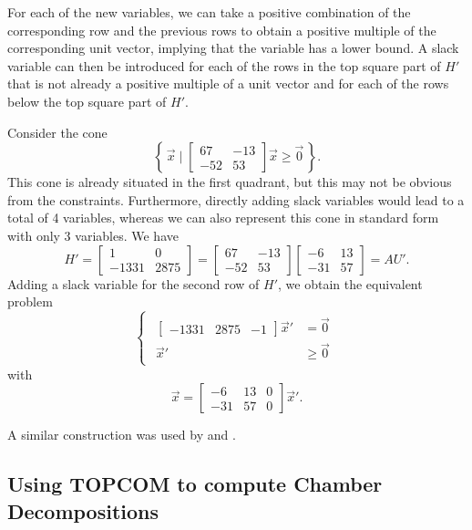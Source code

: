 For each of the new variables, we can take a positive
combination of the corresponding row and the previous rows
to obtain a positive multiple of the corresponding unit vector,
implying that the variable has a lower bound.
A slack variable can then be introduced for each of the
rows in the top square part of $H'$ that is not already
a positive multiple of a unit vector and for each of
the rows below the top square part of $H'$.

\begin{example}
Consider the cone
$$
\left\{\,
\vec x \mid
\begin{bmatrix}
67 & -13 \\
-52 & 53
\end{bmatrix}
\vec x
\ge
\vec 0
\,\right\}
.
$$
This cone is already situated in the first quadrant,
but this may not be obvious from the constraints.
Furthermore, directly adding slack variables would
lead to a total of 4 variables, whereas we can also
represent this cone in standard form with only 3 variables.
We have
$$
H' =
\begin{bmatrix}
1 & 0 \\
-1331 & 2875
\end{bmatrix}
=
\begin{bmatrix}
67 & -13 \\
-52 & 53
\end{bmatrix}
\begin{bmatrix}
-6 & 13 \\
-31 & 57
\end{bmatrix}
= A U'
.
$$
Adding a slack variable for the second row of $H'$, we
obtain the equivalent problem
$$
\begin{cases}
\begin{aligned}
\begin{bmatrix}
-1331 & 2875 & -1
\end{bmatrix}
\vec x'
& =
\vec 0
\\
\vec x' & \ge \vec 0
\end{aligned}
\end{cases}
$$
with
$$
\vec x =
\begin{bmatrix}
-6 & 13 & 0 \\
-31 & 57 & 0
\end{bmatrix}
\vec x'
.
$$
\end{example}

A similar construction was used by 
and .

\subsection{Using TOPCOM to compute Chamber Decompositions}

